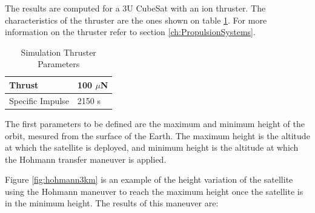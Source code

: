 The results are computed for a 3U CubeSat with an ion thruster. The characteristics of the thruster are the ones shown on table \ref{thrustspimpulse}. For more information on the thruster refer to section \ref{ch:PropulsionSystems}.

\begin{table}[h!]
\begin{center}
\begin{tabular}{ | l | l | }
\hline
Thrust & 100 $\mu$N \\ 
\hline 
Specific Impulse & 2150 s \\
\hline
\end{tabular}
\caption{Simulation Thruster Parameters}
\label{thrustspimpulse}
\end{center}
\end{table}

The first parameters to be defined are the maximum and minimum height of the orbit, mesured from the surface of the Earth. The maximum height is the altitude at which the satellite is deployed, and minimum height is the altitude at which the Hohmann transfer maneuver is applied.

Figure \ref{fig:hohmann3km} is an example of the height variation of the satellite using the Hohmann maneuver to reach the maximum height once the satellite is in the minimum height. The results of this maneuver are:

